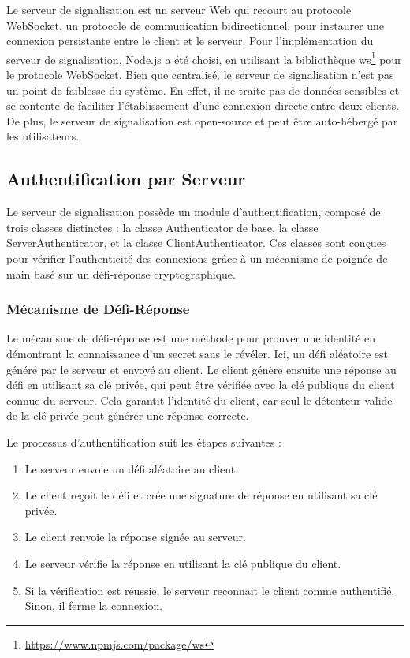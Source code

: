 Le serveur de signalisation est un serveur Web qui recourt au protocole WebSocket, un protocole de communication bidirectionnel, pour instaurer une connexion persistante entre le client et le serveur. Pour l'implémentation du serveur de signalisation, Node.js a été choisi, en utilisant la bibliothèque ws\footnote{\url{https://www.npmjs.com/package/ws}} pour le protocole WebSocket. Bien que centralisé, le serveur de signalisation n'est pas un point de faiblesse du système. En effet, il ne traite pas de données sensibles et se contente de faciliter l'établissement d'une connexion directe entre deux clients. De plus, le serveur de signalisation est open-source et peut être auto-hébergé par les utilisateurs.

\subsection{Authentification par Serveur}

Le serveur de signalisation possède un module d'authentification, composé de trois classes distinctes : la classe Authenticator de base, la classe ServerAuthenticator, et la classe ClientAuthenticator. Ces classes sont conçues pour vérifier l'authenticité des connexions grâce à un mécanisme de poignée de main basé sur un défi-réponse cryptographique.

\subsubsection{Mécanisme de Défi-Réponse}

Le mécanisme de défi-réponse est une méthode pour prouver une identité en démontrant la connaissance d'un secret sans le révéler. Ici, un défi aléatoire est généré par le serveur et envoyé au client. Le client génère ensuite une réponse au défi en utilisant sa clé privée, qui peut être vérifiée avec la clé publique du client connue du serveur. Cela garantit l'identité du client, car seul le détenteur valide de la clé privée peut générer une réponse correcte.

Le processus d'authentification suit les étapes suivantes :

\begin{enumerate}
  \item Le serveur envoie un défi aléatoire au client.
  \item Le client reçoit le défi et crée une signature de réponse en utilisant sa clé privée.
  \item Le client renvoie la réponse signée au serveur.
  \item Le serveur vérifie la réponse en utilisant la clé publique du client.
  \item Si la vérification est réussie, le serveur reconnait le client comme authentifié. Sinon, il ferme la connexion.
\end{enumerate}

